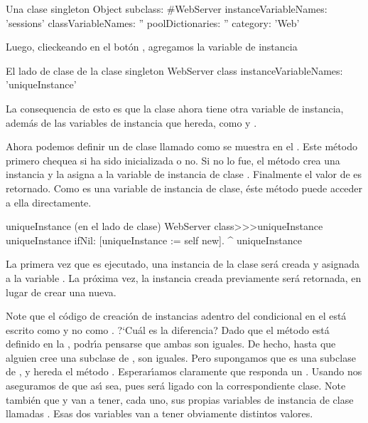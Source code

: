 \documentclass[a4paper,10pt,twoside]{book}
\begin{document}
\begin{classdef}[singleton]{Una clase singleton}
Object subclass: #WebServer
	instanceVariableNames: 'sessions' 	
	classVariableNames: '' 	
	poolDictionaries: '' 	
	category: 'Web'
\end{classdef}

Luego, clieckeando en el bot\'on , agregamos la variable de instancia  

\begin{classdef}[webserver]{El lado de clase de la clase singleton}
WebServer class 	
	instanceVariableNames: 'uniqueInstance'
\end{classdef}

La consequencia de esto es que la clase  ahora tiene otra variable de instancia, 
adem\'as de las variables de instancia que hereda, como  y .


Ahora podemos definir un  de clase llamado  como se muestra en el .
Este m\'etodo primero chequea si   ha sido inicializada o no.
Si no lo fue, el m\'etodo crea una instancia y la asigna a la variable de instancia de clase  .  
Finalmente el valor de  es retornado.
Como   es una variable de instancia de clase, \'este m\'etodo puede acceder a ella directamente. 

    
\begin{method}[uniqueInstance]{uniqueInstance (en el lado de clase)}
WebServer class>>>uniqueInstance
     uniqueInstance ifNil: [uniqueInstance := self new].
     ^ uniqueInstance
\end{method}

La primera vez que  es ejecutado, una instancia de la clase   ser\'a creada y asignada a la variable .
La pr\'oxima vez, la instancia creada previamente ser\'a retornada, en lugar de crear una nueva. 


Note que el c\'odigo de creaci\'on de instancias adentro del condicional en el  est\'a escrito como   y no como .
?`Cu\'al es la diferencia?   Dado que el m\'etodo  est\'a definido en la , podr\'\i{}a pensarse que ambas son iguales. De hecho, hasta que alguien cree una subclase de , son iguales. Pero supongamos que  es una subclase de  , y hereda el m\'etodo . Esperar\'\i{}amos claramente que  responda un . Usando \self nos aseguramos de que as\'\i{} sea, pues ser\'a ligado con la correspondiente clase. 
Note tambi\'en que  y  van a tener, cada uno, sus propias variables de instancia de clase llamadas
.  Esas dos variables van a tener obviamente distintos valores.
\end{document}
